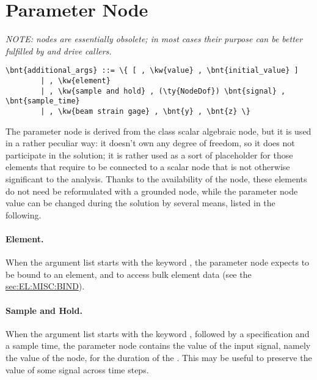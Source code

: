\section{Parameter Node}
\label{sec:NODE:PARAMETER}

\emph{NOTE:  nodes are essentially obsolete;
in most cases their purpose can be better fulfilled
by  and  drive callers.}

\begin{Verbatim}[commandchars=\\\{\}]
    \bnt{additional_args} ::= \{ [ , \kw{value} , \bnt{initial_value} ]
        | , \kw{element}
        | , \kw{sample and hold} , (\ty{NodeDof}) \bnt{signal} , \bnt{sample_time}
        | , \kw{beam strain gage} , \bnt{y} , \bnt{z} \}
\end{Verbatim}
The parameter node is derived from the class scalar algebraic node, but it
is used in a rather peculiar way: it doesn't own any degree of freedom,
so it does not participate in the solution; it is rather used as a sort of
placeholder for those elements that require to be connected to a scalar node
that is not otherwise significant to the analysis.
Thanks to the availability of the  node, these elements
do not need be reformulated with a grounded node, while the parameter
node value can be changed during the solution by several means,
listed in the following.

\paragraph{Element.}
\label{sec:NODE:PARAMETER:ELEMENT}
When the argument list starts with the keyword , the parameter
node expects to be bound to an element, and to access bulk element data 
(see the \hyperref{\kwnd{bind} statement}{\kw{bind} statement, Section~}{}{sec:EL:MISC:BIND}).

\paragraph{Sample and Hold.}
\label{sec:NODE:PARAMETER:SAH}
When the argument list starts with the keyword ,
followed by a  specification and a sample time,
the parameter node contains the value of the input signal, namely
the value of the node, for the duration of the .
This may be useful to preserve the value of some signal across
time steps.

